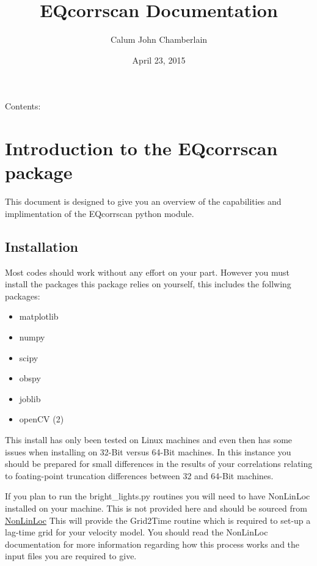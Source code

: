 \documentclass[a4paper,10pt,english]{sphinxmanual}
\title{EQcorrscan Documentation}
\date{April 23, 2015}
\author{Calum John Chamberlain}
\begin{document}
\maketitle
\tableofcontents
{}\label{index::doc}


Contents:


\chapter{Introduction to the EQcorrscan package}
\label{intro::doc}\label{intro:introduction-to-the-eqcorrscan-package}\label{intro:welcome-to-eqcorrscan-s-documentation}
This document is designed to give you an overview of the capabilities and
implimentation of the EQcorrscan python module.


\section{Installation}
\label{intro:installation}
Most codes should work without any effort on your part.  However you must
install the packages this package relies on yourself, this includes the follwing
packages:
\begin{itemize}
\item {} 
matplotlib

\item {} 
numpy

\item {} 
scipy

\item {} 
obspy

\item {} 
joblib

\item {} 
openCV (2)

\end{itemize}

This install has only been tested on Linux machines and even then has some
issues when installing on 32-Bit versus 64-Bit machines.  In this instance you
should be prepared for small differences in the results of your correlations
relating to foating-point truncation differences between 32 and 64-Bit
machines.

If you plan to run the bright\_lights.py routines you will need to have
NonLinLoc installed on your machine.  This is not provided here and should
be sourced from \href{http://alomax.free.fr/nlloc/}{NonLinLoc} This will provide
the Grid2Time routine which is required to set-up a lag-time grid for your
velocity model.  You should read the NonLinLoc documentation for more
information regarding how this process works and the input files you are
required to give.
\end{document}
